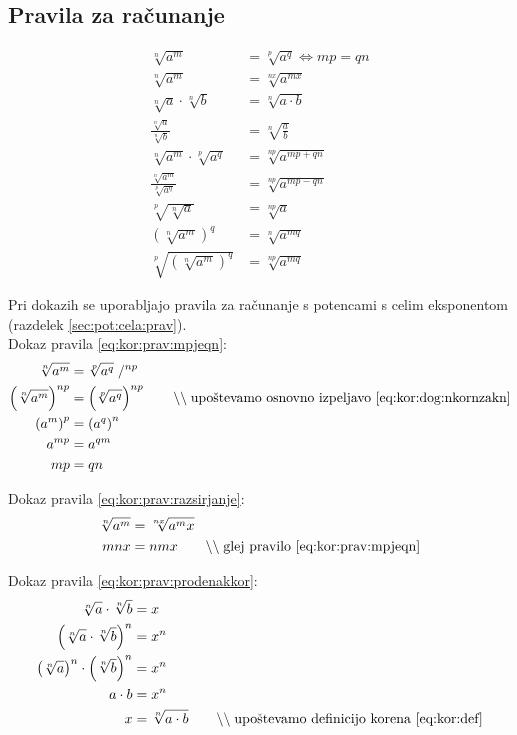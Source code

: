 \documentclass[a4paper,oneside,12pt,fleqn]{article}
\newcommand\krat\cdot
\newcommand{\comment}[1]{\ensuremath{\qquad\backslash\backslash\;}\textnormal{#1}}
\renewcommand\iff\Leftrightarrow
\numberwithin{equation}{section}
\begin{document}
\subsection{Pravila za računanje}
\label{sec:kor:prav}
\begin{align}
  \sqrt[n]{a^m} &= \sqrt[p]{a^q} \iff mp = qn \label{eq:kor:prav:mpjeqn} \\
  \sqrt[n]{a^m} &= \sqrt[nx]{a^{mx}} \label{eq:kor:prav:razsirjanje} \\ 
  \sqrt[n]{a} \krat \sqrt[n]{b} &= \sqrt[n]{a \krat b} \label{eq:kor:prav:prodenakkor} \\
  \frac{\sqrt[n]{a}}{\sqrt[n]{b}} &= \sqrt[n]{\frac{a}{b}} \label{eq:kor:prav:ulenakkor} \\
  \sqrt[n]{a^m} \krat \sqrt[p]{a^q} &= \sqrt[np]{a^{mp+qn}} \label{eq:kor:prav:prodkor} \\
  \frac{\sqrt[n]{a^m}}{\sqrt[p]{a^q}} &= \sqrt[np]{a^{mp-qn}} \label{eq:kor:prav:kvockor} \\
  \sqrt[p]{\sqrt[n]{a}} &= \sqrt[np]{a} \label{eq:kor:prav:korkor} \\
  \left( \sqrt[n]{a^m} \right)^q &= \sqrt[n]{a^{mq}}  \label{eq:kor:prav:koranannaq} \\
  \sqrt[p]{\left( \sqrt[n]{a^m} \right)^q} &= \sqrt[np]{a^{mq}} \label{eq:kor:prav:korkoranannaq}
\end{align}

Pri dokazih se uporabljajo pravila za računanje s potencami s celim eksponentom (razdelek
\ref{sec:pot:cela:prav}).\\[5pt]
Dokaz pravila \ref{eq:kor:prav:mpjeqn}:
\begin{align*}
  \sqrt[n]{a^m} &= \sqrt[p]{a^q} \;/^{np} \\
  \left(\sqrt[n]{a^m}\right)^{np} &= \left(\sqrt[p]{a^q} \right)^{np} \comment{upoštevamo
  osnovno izpeljavo \eqref{eq:kor:dog:nkornzakn}} \\
  \left( a^m \right)^p &= \left( a^q \right)^n \\
  a^{mp} &= a^{qm} \\
  mp &= qn
\end{align*}

Dokaz pravila \ref{eq:kor:prav:razsirjanje}:
\begin{align*}
  \sqrt[n]{a^m} &= \sqrt[nx]{a^mx} \\
  mnx &= nmx \comment{glej pravilo \eqref{eq:kor:prav:mpjeqn}}
\end{align*}

Dokaz pravila \ref{eq:kor:prav:prodenakkor}:
\begin{align*}
  \sqrt[n]{a} \krat \sqrt[n]{b} &= x \\
  \left( \sqrt[n]{a} \krat \sqrt[n]{b} \right)^n &= x^n \\
  \left(\sqrt[n]{a}\right)^n \krat \left(\sqrt[n]{b} \right)^n &= x^n \\
  a \krat b &= x^n \\
  x &= \sqrt[n]{a\krat b} \comment{upoštevamo definicijo korena \eqref{eq:kor:def}}
\end{align*}
\end{document}

